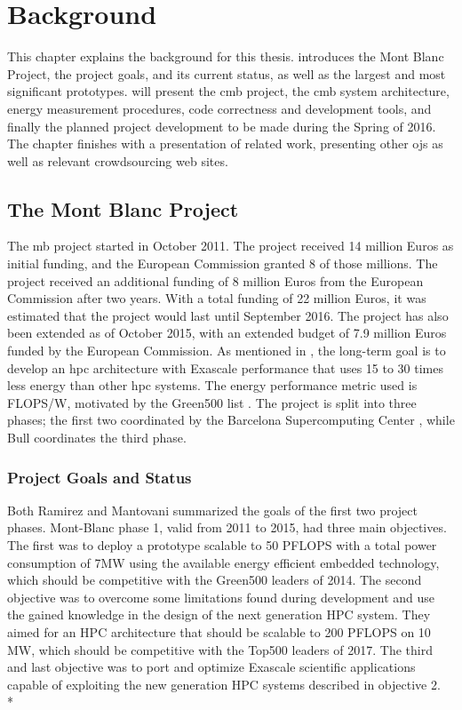 \chapter{Background}
\label{ch:background}
This chapter explains the background for this thesis.  introduces the Mont Blanc Project, the project goals, and its current status, as well as the largest and most significant prototypes.  will present the \gls{cmb} project, the \gls{cmb} system architecture, energy measurement procedures, code correctness and development tools, and finally the planned project development to be made during the Spring of 2016. The chapter finishes with a presentation of related work, presenting other \glspl{oj} as well as relevant crowdsourcing web sites.

\section{The Mont Blanc Project}
\label{sec:mbp}
The \gls{mb} project \cite{MB} started in October 2011. The project received 14 million Euros as initial funding, and the European Commission granted 8 of those millions. The project received an additional funding of 8 million Euros from the European Commission after two years. With a total funding of 22 million Euros, it was estimated that the project would last until September 2016. The project has also been extended as of October 2015, with an extended budget of 7.9 million Euros funded by the European Commission. As mentioned in , the long-term goal is to develop an \gls{hpc} architecture with Exascale performance that uses 15 to 30 times less energy than other \gls{hpc} systems. The energy performance metric used is FLOPS/W, motivated by the Green500 list \cite{GREEN500}. The project is split into three phases; the first two coordinated by the Barcelona Supercomputing Center \cite{BSC}, while Bull \cite{BULL} coordinates the third phase.

\subsection{Project Goals and Status}
Both Ramirez \cite{p:MB-PRACE-14} and Mantovani \cite{p:MB-15} summarized the goals of the first two project phases. Mont-Blanc phase 1, valid from 2011 to 2015, had three main objectives. The first was to deploy a prototype scalable to 50 PFLOPS with a total power consumption of 7MW using the available energy efficient embedded technology, which should be competitive with the Green500 leaders of 2014. The second objective was to overcome some limitations found during development and use the gained knowledge in the design of the next generation HPC system. They aimed for an HPC architecture that should be scalable to 200 PFLOPS on 10 MW, which should be competitive with the Top500 leaders of 2017. The third and last objective was to port and optimize Exascale scientific applications capable of exploiting the new generation HPC systems described in objective 2. \\*

